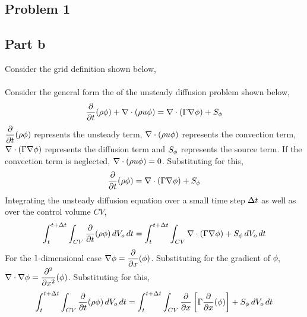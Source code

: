 \documentclass[class=report, 12pt, crop=false]{standalone}
\begin{document}
\begin{center}


\section{Problem 1}
\begin{comment}
\end{comment}
\subsection{Part b}
Consider the grid definition shown below,
\\~\\Consider the general form the of the unsteady diffusion problem shown below,
$$\frac{\partial}{\partial t}(\rho \phi) + \nabla\cdot(\rho u \phi) = \nabla\cdot(\Gamma \nabla\phi) + S_\phi$$
$\displaystyle{\frac{\partial}{\partial t}(\rho \phi)}$ represents the unsteady term, $\displaystyle{\nabla\cdot(\rho u \phi)}$ represents the convection term, $\displaystyle{\nabla\cdot(\Gamma \nabla\phi)}$ represents the diffusion term and $\displaystyle{S_\phi}$ represents the source term. If the convection term is neglected, $\displaystyle{\nabla\cdot(\rho u \phi)=0}$. Substituting for this,
$$\frac{\partial}{\partial t}(\rho \phi) = \nabla\cdot(\Gamma \nabla\phi) + S_\phi$$
Integrating the unsteady diffusion equation over a small time step $\displaystyle{\Delta t}$ as well as over the control volume $CV$,
$$\int^{t+\Delta t}_{t}\int_{CV}\frac{\partial}{\partial t}(\rho \phi)\,dV_o\,dt = \int^{t+\Delta t}_{t}\int_{CV}\nabla\cdot(\Gamma \nabla\phi) + S_\phi\,dV_o\,dt$$
For the $1$-dimensional case $\displaystyle{\nabla\phi} = \frac{\partial}{\partial x}(\phi)$. Substituting for the gradient of $\phi$, $\displaystyle{\nabla\cdot\nabla\phi = \frac{\partial^2}{\partial x^2}(\phi)}$. Substituting for this,
$$\int^{t+\Delta t}_{t}\int_{CV}\frac{\partial}{\partial t}(\rho \phi)\,dV_o\,dt = \int^{t+\Delta t}_{t}\int_{CV}\frac{\partial}{\partial x}\left[\Gamma \frac{\partial}{\partial x}(\phi)\right] + S_\phi\,dV_o\,dt$$


\end{center}
\end{document}
